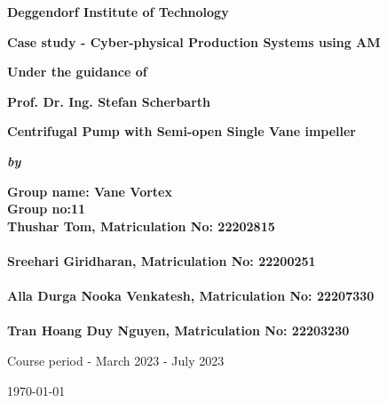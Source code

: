 \documentclass[11pt,a4paper]{scrartcl}
\begin{document}
%
\titlehead{}
\onecolumn

\begin{center}
\textbf{\fontsize{14}{\baselineskip}\selectfont Deggendorf Institute of Technology}

\bigskip

\textbf{\fontsize{14}{\baselineskip}\selectfont Case study - Cyber-physical Production Systems using AM}

\bigskip

\textbf{\fontsize{12}{\baselineskip}\selectfont Under the guidance of }

\bigskip

\textbf{\fontsize{14}{\baselineskip}\selectfont Prof. Dr. Ing. Stefan Scherbarth}

\bigskip
\bigskip
\bigskip

\textbf{\fontsize{20}{\baselineskip}\selectfont Centrifugal Pump with Semi-open Single Vane impeller}

\bigskip

\bigskip

\bigskip

\textit{\textbf{\fontsize{14}{\baselineskip}\selectfont by}}

\bigskip

\bigskip

\bigskip

\textbf{\fontsize{14}{\baselineskip}\selectfont Group name: Vane Vortex\\ }
\bigskip
\textbf{\fontsize{14}{\baselineskip}\selectfont Group no:11\\ }
\bigskip
\bigskip
\textbf{\fontsize{14}{\baselineskip}\selectfont Thushar Tom, Matriculation No: 22202815\\ }
\textbf{\fontsize{14}{\baselineskip}\selectfont \\ }
\textbf{\fontsize{14}{\baselineskip}\selectfont Sreehari Giridharan, Matriculation No: 22200251 \\}
\textbf{\fontsize{14}{\baselineskip}\selectfont \\ }
\textbf{\fontsize{14}{\baselineskip}\selectfont Alla Durga Nooka Venkatesh, Matriculation No: 22207330 \\}
\textbf{\fontsize{14}{\baselineskip}\selectfont \\ }
\textbf{\fontsize{14}{\baselineskip}\selectfont Tran Hoang Duy Nguyen, Matriculation No: 22203230 \\}

\bigskip

\bigskip

\bigskip

Course period - March 2023 - July 2023\\



\bigskip

\bigskip


{\today}
\end{center}
\bigskip
\clearpage
%
%
\tableofcontents
\newpage
\end{document}
